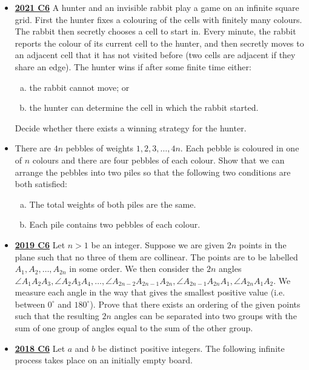 \documentclass[11pt]{scrartcl}
\begin{document}
\begin{itemize}[leftmargin=*]
    \item \href{https://artofproblemsolving.com/community/c6h2882577p25627683}{\textbf{2021 C6}} 	A hunter and an invisible rabbit play a game on an infinite square grid. First the hunter fixes a colouring of the cells with finitely many colours. The rabbit then secretly chooses a cell to start in. Every minute, the rabbit reports the colour of its current cell to the hunter, and then secretly moves to an adjacent cell that it has not visited before (two cells are adjacent if they share an edge). The hunter wins if after some finite time either:
    \begin{enumerate}[(a)]
        \item the rabbit cannot move; or
        \item the hunter can determine the cell in which the rabbit started.
    \end{enumerate}
Decide whether there exists a winning strategy for the hunter.
    \item {} There are $4n$ pebbles of weights $1, 2, 3, \dots, 4n.$ Each pebble is coloured in one of $n$ colours and there are four pebbles of each colour. Show that we can arrange the pebbles into two piles so that the following two conditions are both satisfied:
    \begin{enumerate}[(a)]
        \item The total weights of both piles are the same.
        \item Each pile contains two pebbles of each colour.
    \end{enumerate}
    \item \href{https://artofproblemsolving.com/community/c6h2279018p17828946}{\textbf{2019 C6}} Let $n>1$ be an integer. Suppose we are given $2n$ points in the plane such that no three of them are collinear. The points are to be labelled $A_1, A_2, \dots , A_{2n}$ in some order. We then consider the $2n$ angles $\angle A_1A_2A_3, \angle A_2A_3A_4, \dots , \angle A_{2n-2}A_{2n-1}A_{2n}, \angle A_{2n-1}A_{2n}A_1, \angle A_{2n}A_1A_2$. We measure each angle in the way that gives the smallest positive value (i.e. between $0^{\circ}$ and $180^{\circ}$). Prove that there exists an ordering of the given points such that the resulting $2n$ angles can be separated into two groups with the sum of one group of angles equal to the sum of the other group.	
    \item \href{https://artofproblemsolving.com/community/c6h1876766p12752833}{\textbf{2018 C6}} Let $a$ and $b$ be distinct positive integers. The following infinite process takes place on an initially empty board.

\end{itemize}
\end{document}
